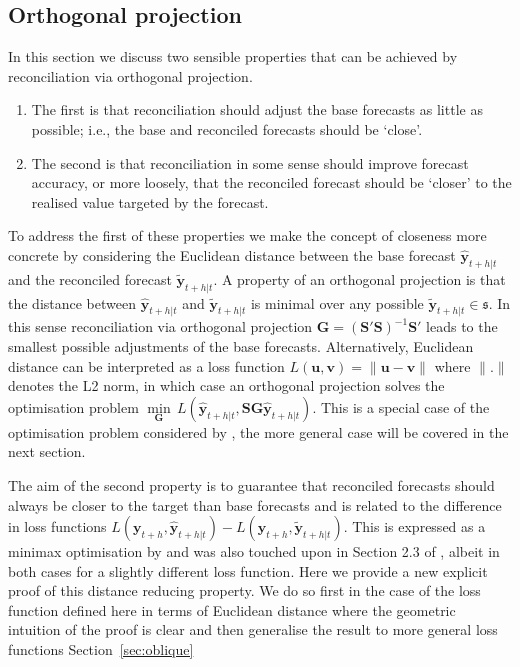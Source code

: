 \documentclass[12pt]{article}
\theoremstyle{definition}
\begin{document}
\subsection{Orthogonal projection}\label{sec:orthogonal}

In this section we discuss two sensible properties that can be achieved by reconciliation via orthogonal projection.
\begin{enumerate}
\item The first is that reconciliation should adjust the base forecasts as little as possible; i.e., the base and reconciled forecasts should be `close'.
\item The second is that reconciliation in some sense should improve forecast accuracy, or more loosely, that the reconciled forecast should be `closer' to the realised value targeted by the forecast.
\end{enumerate}

To address the first of these properties we make the concept of closeness more concrete by considering the Euclidean distance between the base forecast $\hat{\bm{y}}_{t+h|t}$ and the reconciled forecast $\tilde{\bm{y}}_{t+h|t}$. A property of an orthogonal projection is that the distance between $\hat{\bm{y}}_{t+h|t}$ and $\tilde{\bm{y}}_{t+h|t}$ is minimal over any possible $\tilde{\bm{y}}_{t+h|t}\in\mathfrak{s}$. In this sense reconciliation via orthogonal projection {\color{blue} $\bm{G}=(\bm{S}'\bm{S})^{-1}\bm{S}'$} leads to the smallest possible adjustments of the base forecasts.  {\color{blue} Alternatively, Euclidean distance can be interpreted as a loss function $L(\bm{u},\bm{v})=\|\bm{u}-\bm{v}\|$ where $\|.\|$ denotes the L2 norm, in which case an orthogonal projection solves the optimisation problem $\underset{\bm{G}}{\min}\,L(\hat{\bm{y}}_{t+h|t},\bm{S}\bm{G}\hat{\bm{y}}_{t+h|t})$. This is a special case of the optimisation problem considered by \cite{NysEtAl2020}, the more general case will be covered in the next section.}

The {\color{blue} aim of the second property is to guarantee that} reconciled forecasts should always be closer to the target than base forecasts {\color{blue} and is related to the difference in loss functions $L({\bm{y}}_{t+h},\hat{\bm{y}}_{t+h|t})-L({\bm{y}}_{t+h},\tilde{\bm{y}}_{t+h|t})$.  This is expressed as a minimax optimisation by \cite{VanErven2015a} and was also} touched upon in Section 2.3 of \citet{WicEtAl2019}{\color{blue}, albeit in both cases for a slightly different loss function}. Here we provide a new explicit proof of {\color{blue} this distance reducing property}. We do so first in the case {\color{blue} of the loss function defined here in terms of Euclidean distance} where the geometric intuition of the proof is clear and then generalise the result to {\color{blue} more general loss functions} Section~\ref{sec:oblique}
\end{document}
